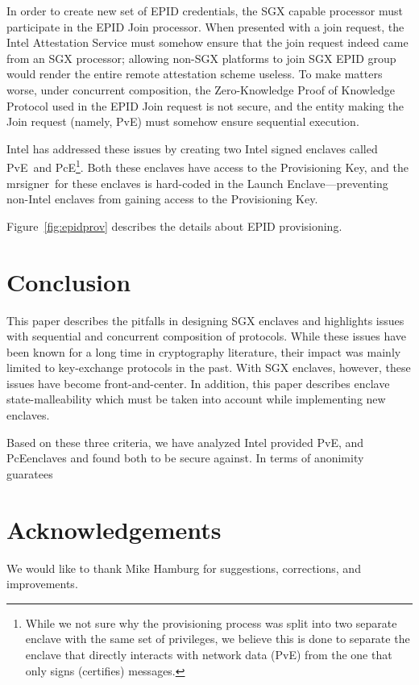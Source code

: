 \documentclass[letterpaper]{article}
\newcommand{\mrsigner}{\textsf{mrsigner}}
\newcommand{\pve}{\textsf{PvE}}
\newcommand{\pce}{\textsf{PcE}}
\newcommand{\launchenclave}{\textsf{Launch Enclave}}
\begin{document}
  In order to create new set of EPID credentials, the SGX capable
  processor must participate in the EPID Join processor. When
  presented with a join request, the Intel Attestation Service must
  somehow ensure that the join request indeed came from an SGX
  processor; allowing non-SGX platforms to join SGX EPID group would
  render the entire remote attestation scheme useless. To make matters
  worse, under concurrent composition, the Zero-Knowledge Proof of
  Knowledge Protocol used in the EPID Join request is not secure, and
  the entity making the Join request (namely, \pve) must somehow
  ensure sequential execution.

  Intel has addressed these issues by creating two Intel signed
  enclaves called \pve\ and \pce\footnote{While we not sure why the
    provisioning process was split into two separate enclave with the
    same set of privileges, we believe this is done to separate the
    enclave that directly interacts with network data (\pve) from the
    one that only signs (certifies) messages.}. Both these enclaves
  have access to the Provisioning Key, and the \mrsigner\ for these
  enclaves is hard-coded in the \launchenclave---preventing non-Intel
  enclaves from gaining access to the Provisioning Key.

  Figure~\ref{fig:epidprov} describes the details about EPID
  provisioning.

\section{Conclusion}
  This paper describes the pitfalls in designing SGX enclaves and 
  highlights issues with sequential and concurrent composition of 
  protocols. While these issues have been known for a long time 
  in cryptography literature, their impact was mainly limited to 
  key-exchange protocols in the past. With SGX enclaves, however, 
  these issues have become front-and-center. In addition, this paper
  describes enclave state-malleability which must be taken into 
  account while implementing new enclaves.

  Based on these three criteria, we have analyzed Intel provided \pve, and 
  \pce enclaves and found both to be secure against. In terms of 
  anonimity guaratees  

\section{Acknowledgements}
  We would like to thank Mike Hamburg for suggestions, corrections, and 
  improvements.
 
\end{document}
